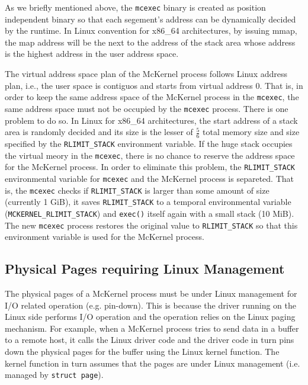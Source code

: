 \documentclass[twoside,11pt,fleqn]{book}
\newcounter{subsubsubsection}[subsubsection]
\begin{document}
As we briefly mentioned above, the \texttt{mcexec} binary is created as
position independent binary
so that each segement's address can be dynamically decided by the runtime.
In Linux convention for x86\_64 architectures, by issuing mmap, the map address
will be the next to the address of the stack area whose address is the highest
address in the user address space.

The virtual address space plan of the McKernel process follows Linux
address plan, i.e., the user space is contiguos and starts from
virtual address 0.
That is, in order to keep the same address space of the McKernel process
in the \texttt{mcexec}, the same address space must not be occupied by
the \texttt{mcexec} process.
There is one problem to do so.
In Linux for x86\_64 architectures,
the start address of a stack area is randomly decided and its
size is the lesser of $\frac{5}{6}$ total memory size and size
specified by the \texttt{RLIMIT\_STACK} environment variable.
If the huge stack occupies the virtual meory in the \texttt{mcexec},
there is no chance to reserve the address space for the McKernel process.
In order to eliminate this problem,
the \texttt{RLIMIT\_STACK} environmental variable for \texttt{mcexec} and
the McKernel process is separeted.
That is, the \texttt{mcexec} checks if \texttt{RLIMIT\_STACK} is
larger than some amount of size (currently 1 GiB),
it saves \texttt{RLIMIT\_STACK} to a temporal environmental variable (\texttt{MCKERNEL\_RLIMIT\_STACK}) and \texttt{exec()} itself again with a small stack (10 MiB).
The new \texttt{mcexec} process restores the original value to \texttt{RLIMIT\_STACK}
so that this environment variable
is used for the McKernel process.



\subsection{Physical Pages requiring Linux Management}
The physical pages of a McKernel process must be under Linux management for I/O related operation (e.g. pin-down).
This is because the driver running on the Linux side performs I/O operation and the operation relies on the Linux paging mechanism.
For example, when a McKernel process tries to send data in a buffer to a remote host,
it calls the Linux driver code and the driver code in turn pins down the physical pages for the buffer using the Linux kernel function.
The kernel function in turn assumes that the pages are under Linux management (i.e. managed by \texttt{struct page}).
\end{document}
